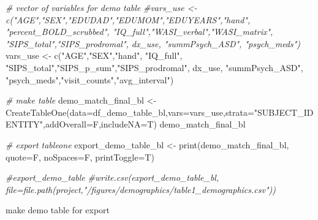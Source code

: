 \documentclass[
]{article}
\newenvironment{Shaded}{\begin{snugshade}}{\end{snugshade}}
\newcommand{\AttributeTok}[1]{\textcolor[rgb]{0.77,0.63,0.00}{#1}}
\newcommand{\CommentTok}[1]{\textcolor[rgb]{0.56,0.35,0.01}{\textit{#1}}}
\newcommand{\FunctionTok}[1]{\textcolor[rgb]{0.00,0.00,0.00}{#1}}
\newcommand{\NormalTok}[1]{#1}
\newcommand{\OtherTok}[1]{\textcolor[rgb]{0.56,0.35,0.01}{#1}}
\newcommand{\StringTok}[1]{\textcolor[rgb]{0.31,0.60,0.02}{#1}}
\begin{document}
\begin{Shaded}
\begin{Highlighting}[]
\CommentTok{\# vector of variables for demo table}
\CommentTok{\#vars\_use \textless{}{-} c("AGE","SEX","EDUDAD","EDUMOM","EDUYEARS","hand", "percent\_BOLD\_scrubbed", "IQ\_full","WASI\_verbal","WASI\_matrix", "SIPS\_total","SIPS\_prodromal", dx\_use, "summPsych\_ASD", "psych\_meds")}
\NormalTok{vars\_use }\OtherTok{\textless{}{-}} \FunctionTok{c}\NormalTok{(}\StringTok{"AGE"}\NormalTok{,}\StringTok{"SEX"}\NormalTok{,}\StringTok{"hand"}\NormalTok{, }\StringTok{"IQ\_full"}\NormalTok{, }\StringTok{"SIPS\_total"}\NormalTok{,}\StringTok{"SIPS\_p\_sum"}\NormalTok{,}\StringTok{"SIPS\_prodromal"}\NormalTok{, dx\_use, }\StringTok{"summPsych\_ASD"}\NormalTok{, }\StringTok{"psych\_meds"}\NormalTok{,}\StringTok{"visit\_counts"}\NormalTok{,}\StringTok{"avg\_interval"}\NormalTok{)}

\CommentTok{\# make table}
\NormalTok{demo\_match\_final\_bl }\OtherTok{\textless{}{-}} \FunctionTok{CreateTableOne}\NormalTok{(}\AttributeTok{data=}\NormalTok{df\_demo\_table\_bl,}\AttributeTok{vars=}\NormalTok{vars\_use,}\AttributeTok{strata=}\StringTok{"SUBJECT\_IDENTITY"}\NormalTok{,}\AttributeTok{addOverall=}\NormalTok{F,}\AttributeTok{includeNA=}\NormalTok{T)}
\NormalTok{demo\_match\_final\_bl}

\CommentTok{\# export tableone}
\NormalTok{export\_demo\_table\_bl }\OtherTok{\textless{}{-}} \FunctionTok{print}\NormalTok{(demo\_match\_final\_bl, }\AttributeTok{quote=}\NormalTok{F, }\AttributeTok{noSpaces=}\NormalTok{F, }\AttributeTok{printToggle=}\NormalTok{T)}

\CommentTok{\#export\_demo\_table}
\CommentTok{\#write.csv(export\_demo\_table\_bl, file=file.path(project,"/figures/demographics/table1\_demographics.csv"))}
\end{Highlighting}
\end{Shaded}

make demo table for export
\end{document}
